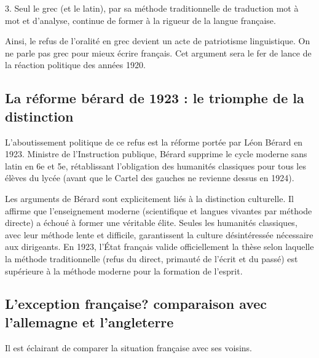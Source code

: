 3. Seul le grec (et le latin), par sa méthode traditionnelle de traduction mot à mot et d'analyse,
continue de former à la rigueur de la langue française.

Ainsi, le refus de l'oralité en grec devient un acte de patriotisme linguistique. On ne parle pas
grec pour mieux écrire français. Cet argument sera le fer de lance de la réaction politique des
années 1920.\cite{I-2-2-ref26}



\subsection{La réforme bérard de 1923 : le triomphe de la distinction}

L'aboutissement politique de ce refus est la réforme portée par Léon Bérard en 1923. Ministre de
l'Instruction publique, Bérard supprime le cycle moderne sans latin en 6e et 5e, rétablissant
l'obligation des humanités classiques pour tous les élèves du lycée (avant que le Cartel des gauches
ne revienne dessus en 1924).\cite{I-2-2-ref7}

Les arguments de Bérard sont explicitement liés à la distinction culturelle. Il affirme que
l'enseignement \og moderne\fg{} (scientifique et langues vivantes par méthode directe) a échoué à
former une véritable élite. Seules les humanités classiques, avec leur méthode lente et difficile,
garantissent la \og culture désintéressée\fg{} nécessaire aux dirigeants. En 1923, l'État français
valide officiellement la thèse selon laquelle la méthode traditionnelle (refus du direct, primauté
de l'écrit et du passé) est supérieure à la méthode moderne pour la formation de
l'esprit.\cite{I-2-2-ref29}



\subsection{L'exception française? comparaison avec l'allemagne et l'angleterre}

Il est éclairant de comparer la situation française avec ses voisins.

